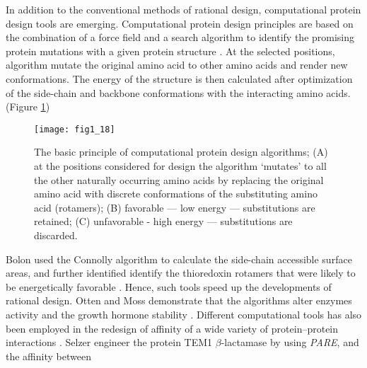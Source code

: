 \begin{refsection}
In addition to the conventional methods of rational design, computational
protein design tools are emerging. Computational protein design principles
are based on the combination of a force field and a search algorithm to
identify the promising protein mutations with a given protein structure
\cite{VanDerSloot2009a}. At the selected positions, algorithm mutate the
original amino acid to other amino acids and render new conformations. The
energy of the structure is then calculated after optimization of the side-chain
and backbone conformations with the interacting amino
acids\cite{VanDerSloot2009a}. (Figure \ref{fig:cpd})
\begin{figure}[h!] \centering \texttt{[image: fig1\_18]}
    \caption[The basic principle of computational protein design algorithms;
        (A) at the positions considered for design the algorithm ‘mutates’ to
        all the other naturally occurring amino acids by replacing the original
        amino acid with discrete conformations of the substituting amino acid
        (rotamers); (B) favorable — low energy — substitutions are retained;
        (C) unfavorable - high energy — substitutions are discarded.]{The basic
            principle of computational protein design algorithms; (A) at the
            positions considered for design the algorithm ‘mutates’ to all the
            other naturally occurring amino acids by replacing the original
            amino acid with discrete conformations of the substituting amino
            acid (rotamers); (B) favorable — low energy — substitutions are
            retained; (C) unfavorable - high energy — substitutions are
            discarded\cite{VanDerSloot2009a}.} 
    \label{fig:cpd} 
\end{figure}
Bolon  used the Connolly algorithm \cite{Connolly1983} to
calculate the side-chain accessible surface areas, and further identified
identify the thioredoxin rotamers that were likely to be energetically
favorable \cite{Bolon2003}. Hence, such tools speed up the developments of
rational design. Otten  and Moss  demonstrate that
the algorithms alter enzymes activity \cite{Otten2010} and the growth hormone
stability \cite{Moss2009}. Different computational tools has also been
employed in the redesign of affinity of a wide variety of protein–protein
interactions \cite{Selzer2000,Reina2002}. Selzer  engineer the
protein TEM1 $\beta$-lactamase by using \emph{PARE}, and the affinity between

\end{refsection}
